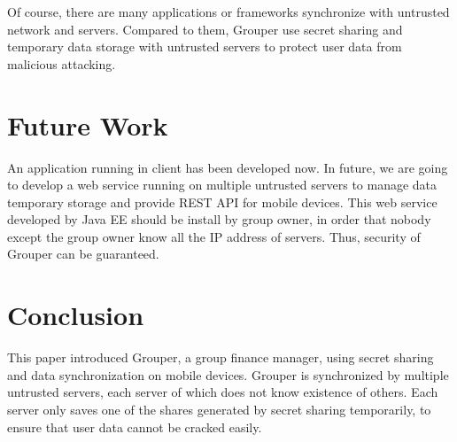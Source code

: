 \documentclass[twocolumn,10pt]{article}
\begin{document}
Of course, there are many applications or frameworks synchronize with untrusted network and servers. Compared to them, Grouper use secret sharing and temporary data storage with untrusted servers to protect user data from malicious attacking.

\section{Future Work}

An application running in client has been developed now. In future, we are going to develop a web service running on multiple untrusted servers to manage data temporary storage and provide REST API for mobile devices. This web service developed by Java EE should be install by group owner, in order that nobody except the group owner know all the IP address of servers. Thus, security of Grouper can be guaranteed.

\section{Conclusion}

This paper introduced Grouper, a group finance manager, using secret sharing and data synchronization on mobile devices. Grouper is synchronized by multiple untrusted servers, each server of which does not know existence of others. Each server only saves one of the shares generated by secret sharing temporarily, to ensure that user data cannot be cracked easily.



\end{document}
